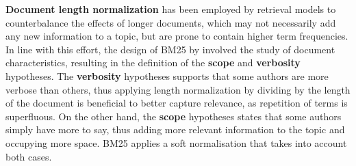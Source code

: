 \noindent \textbf{Document length normalization} \cite{singhal1996pivoted} has been employed by retrieval models to counterbalance the effects of longer documents, which may not necessarily add any new information to a topic, but are prone to contain higher term frequencies. 
In line with this effort, the design of BM25 by \cite{robertson2009probabilistic} involved the study of document characteristics, resulting in the definition of the \textbf{scope} and \textbf{verbosity} hypotheses. The \textbf{verbosity} hypotheses supports that some authors are more verbose than others, thus applying length normalization by dividing by the length of the document is beneficial to better capture relevance, as repetition of terms is superfluous. On the other hand, the \textbf{scope} hypotheses states that some authors simply have more to say, thus adding more relevant information to the topic and occupying more space. BM25 applies a soft normalisation that takes into account both cases.\\ %







